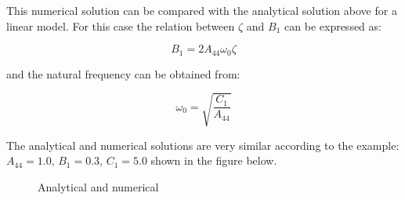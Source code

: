     

    This numerical solution can be compared with the analytical solution
above for a linear model. For this case the relation between $\zeta$
and $B_1$ can be expressed as:
 
            
    
    \begin{equation}
B_{1} = 2 A_{44} \omega_{0} \zeta
\label{eq:equation}
\end{equation}

    

    and the natural frequency can be obtained from:
 
            
    
    \begin{equation}
\omega_{0} = \sqrt{\frac{C_{1}}{A_{44}}}
\label{eq:equation}
\end{equation}

    

    The analytical and numerical solutions are very similar according to the
example: $A_{44} = 1.0$, $B_1 = 0.3$, $C_1 = 5.0$ shown in the
figure below.
    \begin{figure}
        \begin{center}\end{center}
        \caption{Analytical and numerical}
        \label{fig:analytical_numerical}
    \end{figure}
    
    